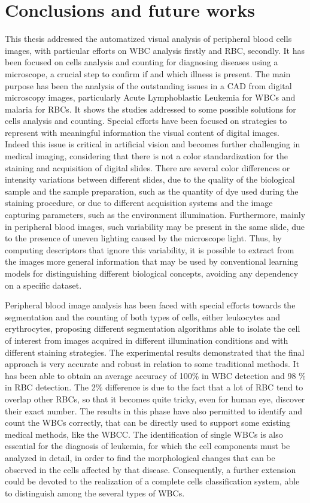 \chapter*{Conclusions and future works}
This thesis addressed the automatized visual analysis of peripheral blood cells images, with particular efforts on WBC analysis firstly and RBC, secondly. It has been focused on cells analysis and counting for diagnosing diseases using a microscope, a crucial step to confirm if and which illness is present. The main purpose has been the analysis of the outstanding issues in a CAD from digital microscopy images, particularly Acute Lymphoblastic Leukemia for WBCs and malaria for RBCs. It shows the studies addressed to some possible solutions for cells analysis and counting. Special efforts have been focused on strategies to represent with meaningful information the visual content of digital images. Indeed this issue is critical in artificial vision and becomes further challenging in medical imaging, considering that there is not a color standardization for the staining and acquisition of digital slides. There are several color differences or intensity variations between different slides, due to the quality of the biological sample and the sample preparation, such as the quantity of dye used during the staining procedure, or due to different acquisition systems and the image capturing parameters, such as the environment illumination. Furthermore, mainly in peripheral blood images, such variability may be present in the same slide, due to the presence of uneven lighting caused by the microscope light. Thus, by computing descriptors that ignore this variability, it is possible to extract from the images more general information that may be used by conventional learning models for distinguishing different biological concepts, avoiding any dependency on a specific dataset. 

Peripheral blood image analysis has been faced with special efforts towards the segmentation and the counting of both types of cells, either leukocytes and erythrocytes, proposing different segmentation algorithms able to isolate the cell of interest from images acquired in different illumination conditions and with different staining strategies.
The experimental results demonstrated that the final approach is very accurate and robust in relation to some traditional methods. It has been able to obtain an average accuracy of 100\% in WBC detection and 98 \%  in RBC detection. The 2\% difference is due to the fact that a lot of RBC tend to overlap other RBCs, so that it becomes quite tricky, even for human eye, discover their exact number. The results in this phase have also permitted to identify and count the WBCs correctly, that can be directly used to support some existing medical methods, like the WBCC. 
The identification of single WBCs is also essential for the diagnosis of leukemia, for which the cell components must be analyzed in detail, in order to find the morphological changes that can be observed in the cells affected by that disease.  Consequently, a further extension could be devoted to the realization of a complete cells classification system, able to distinguish among the several types of WBCs.

